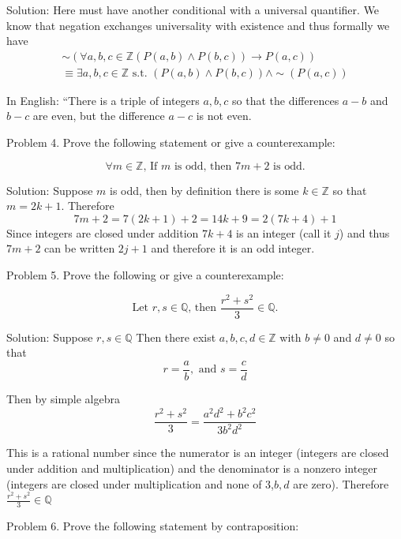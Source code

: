 \documentclass[16 pt]{amsart}
\theoremstyle{definition}
\theoremstyle{remark}
\numberwithin{equation}{subsection}
\newcommand{\Z}{\mathbb{Z}}
\newcommand{\Q}{\mathbb{Q}}
\begin{document}
\vspace{1in}

Solution: Here must have another conditional with a universal quantifier.  We know that negation exchanges universality with existence and thus formally we have
\begin{eqnarray*}
\sim (\forall a,b,c\in\Z (P(a,b)\wedge P(b,c)) \rightarrow P(a,c)) \\
\equiv \exists a,b,c\in\Z \text{ s.t. } (P(a,b)\wedge P(b,c))\wedge \sim(P(a,c)) 
\end{eqnarray*}

In English: ``There is a triple of integers $a,b,c$ so that the differences $a-b$ and $b-c$ are even, but the difference $a-c$ is not even.

\newpage

Problem 4. Prove the following statement or give a counterexample:

\[
\forall m\in\Z \text{, If } m \text{ is odd, then } 7m+2 \text{ is odd.}
\]

\vspace{1in}

Solution: Suppose $m$ is odd, then by definition there is some $k\in\Z$ so that $m=2k+1$.
Therefore
\[
7m+2 = 7(2k+1)+2 = 14k+9 = 2(7k+4) + 1
\]
Since integers are closed under addition $7k+4$ is an integer (call it $j$) and thus $7m+2$ can be written $2j+1$ and therefore it is an odd integer.

\newpage

Problem 5. Prove the following or give a counterexample:

\[
\text{Let } r,s\in\Q \text{, then } \frac{r^2+s^2}{3}\in\Q.
\]

\vspace{1in}

Solution: Suppose $r,s\in\Q$ Then there exist $a,b,c,d\in\Z$ with $b\neq 0$ and $d\neq 0$ so that
\[
r = \frac{a}{b}, \text{ and } s=\frac{c}{d}
\]

Then by simple algebra
\[
\frac{r^2+s^2}{3} = \frac{a^2d^2 + b^2c^2}{3b^2d^2}
\]

This is a rational number since the numerator is an integer (integers are closed under addition and multiplication) and the denominator is a nonzero integer (integers are closed under multiplication and none of 3,$b,d$ are zero). Therefore $\frac{r^2+s^2}{3}\in\Q$


\newpage

Problem 6. Prove the following statement by contraposition:
\end{document}
